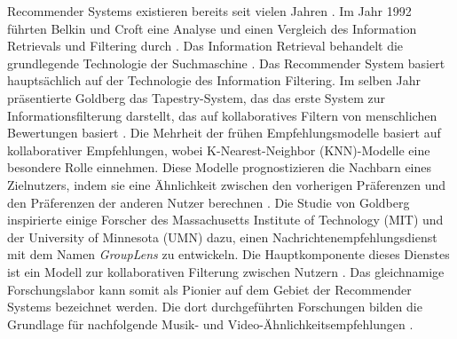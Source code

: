 Recommender Systems existieren bereits seit vielen Jahren \cite{dong2022brief}. Im Jahr 1992 führten Belkin und Croft eine Analyse und einen Vergleich des Information Retrievals und Filtering durch \cite{dong2022brief}. Das Information Retrieval behandelt die grundlegende Technologie der Suchmaschine \cite{dong2022brief}. Das Recommender System basiert hauptsächlich auf der Technologie des Information Filtering. Im selben Jahr präsentierte Goldberg das Tapestry-System, das das erste System zur Informationsfilterung darstellt, das auf kollaboratives Filtern von menschlichen Bewertungen basiert \cite{dong2022brief}. Die Mehrheit der frühen Empfehlungsmodelle basiert auf kollaborativer Empfehlungen, wobei K-Nearest-Neighbor (KNN)-Modelle eine besondere Rolle einnehmen. Diese Modelle prognostizieren die Nachbarn eines Zielnutzers, indem sie eine Ähnlichkeit zwischen den vorherigen Präferenzen und den Präferenzen der anderen Nutzer berechnen \cite{dong2022brief}. Die Studie von Goldberg inspirierte einige Forscher des Massachusetts Institute of Technology (MIT) und der University of Minnesota (UMN) dazu, einen Nachrichtenempfehlungsdienst mit dem Namen \emph{GroupLens} zu entwickeln. Die Hauptkomponente dieses Dienstes ist ein Modell zur kollaborativen Filterung zwischen Nutzern \cite{dong2022brief}. Das gleichnamige Forschungslabor kann somit als Pionier auf dem Gebiet der Recommender Systems bezeichnet werden. Die dort durchgeführten Forschungen bilden die Grundlage für nachfolgende Musik- und Video-Ähnlichkeitsempfehlungen \cite{dong2022brief}. \\

